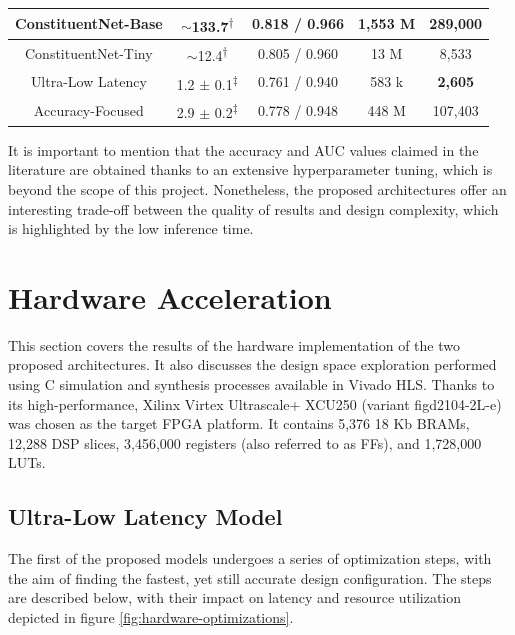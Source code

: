 \begin{table}[!hpt]
\begin{tabular}{|c|c|c|c|c|}
  ConstituentNet-Base \cite{3-yuan2021constituentnet:} & $\sim$133.7\textsuperscript{$\dagger$} & 0.818 / \textbf{0.966} & 1,553 M & 289,000 \\ \hline
  ConstituentNet-Tiny \cite{3-yuan2021constituentnet:} & $\sim$12.4\textsuperscript{$\dagger$} & 0.805 / 0.960 & 13 M  & 8,533 \\ \hline \hline
  Ultra-Low Latency & 1.2 $\pm$ 0.1\textsuperscript{$\ddagger$} & 0.761 / 0.940 & 583 k & \textbf{2,605} \\ \hline
  Accuracy-Focused & 2.9 $\pm$ 0.2\textsuperscript{$\ddagger$} & 0.778 / 0.948 & 448 M & 107,403 \\ \hline
  \end{tabular}
  \egroup
\end{table}

It is important to mention that the accuracy and AUC values claimed in the literature are obtained thanks to an extensive hyperparameter tuning, which is beyond the scope of this project. Nonetheless, the proposed architectures offer an interesting trade-off between the quality of results and design complexity, which is highlighted by the low inference time.

\section{Hardware Acceleration}
This section covers the results of the hardware implementation of the two proposed architectures. It also discusses the design space exploration performed using C simulation and synthesis processes available in Vivado HLS. Thanks to its high-performance, Xilinx Virtex Ultrascale+ XCU250 (variant figd2104-2L-e) was chosen as the target FPGA platform. It contains 5,376 18 Kb BRAMs, 12,288 DSP slices, 3,456,000 registers (also referred to as FFs), and 1,728,000 LUTs.

\subsection{Ultra-Low Latency Model}
The first of the proposed models undergoes a series of optimization steps, with the aim of finding the fastest, yet still accurate design configuration. The steps are described below, with their impact on latency and resource utilization depicted in figure \ref{fig:hardware-optimizations}.

